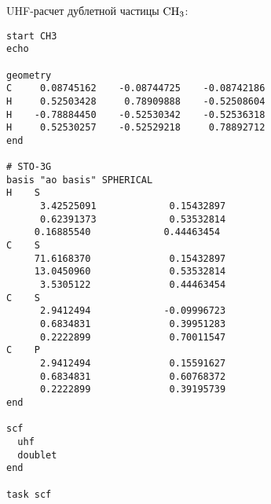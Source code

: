 \documentclass[a4paper, 12pt]{article}
\begin{document}
\bigskip

UHF-расчет дублетной частицы $\rm CH_3$:
\begin{lstlisting}
start CH3
echo

geometry
C     0.08745162    -0.08744725    -0.08742186
H     0.52503428     0.78909888    -0.52508604
H    -0.78884450    -0.52530342    -0.52536318
H     0.52530257    -0.52529218     0.78892712
end

# STO-3G
basis "ao basis" SPHERICAL
H    S
      3.42525091             0.15432897       
      0.62391373             0.53532814       
     0.16885540             0.44463454  
C    S
     71.6168370              0.15432897       
     13.0450960              0.53532814       
      3.5305122              0.44463454       
C    S
      2.9412494             -0.09996723
      0.6834831              0.39951283    
      0.2222899              0.70011547            
C    P
      2.9412494              0.15591627       
      0.6834831              0.60768372       
      0.2222899              0.39195739    
end

scf
  uhf
  doublet
end

task scf
\end{lstlisting}

\clearpage


{}
\end{document}
